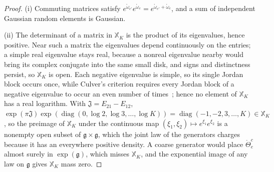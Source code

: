 \begin{proof}
(i) Commuting matrices satisfy $e^{\mathring\omega_{e'}}e^{\mathring\omega_e}=e^{\mathring\omega_{e'}+\mathring\omega_e}$, and a sum of independent Gaussian random elements is Gaussian.

(ii) The determinant of a matrix in $\mathbb X_K$ is the product of its eigenvalues, hence positive. Near such a matrix the eigenvalues depend continuously on the entries; a simple real eigenvalue stays real, because a nonreal eigenvalue nearby would bring its complex conjugate into the same small disk, and signs and distinctness persist, so $\mathbb X_K$ is open. Each negative eigenvalue is simple, so its single Jordan block occurs once, while Culver's criterion requires every Jordan block of a negative eigenvalue to occur an even number of times~\cite{culver1966existence}; hence no element of $\mathbb X_K$ has a real logarithm. With $\mathfrak J=E_{21}-E_{12}$, $\exp(\pi\mathfrak J)\exp(\operatorname{diag}(0,\log2,\log3,\ldots,\log K))=\operatorname{diag}(-1,-2,3,\ldots,K)\in\mathbb X_K$, so the preimage of $\mathbb X_K$ under the continuous map $(\xi_1,\xi_2)\mapsto e^{\xi_1}e^{\xi_2}$ is a nonempty open subset of $\mathfrak g\times\mathfrak g$, which the joint law of the generators charges because it has an everywhere positive density. A coarse generator would place $\mathring\Theta^c_e$ almost surely in $\exp(\mathfrak g)$, which misses $\mathbb X_K$, and the exponential image of any law on $\mathfrak g$ gives $\mathbb X_K$ mass zero.


\end{proof}
